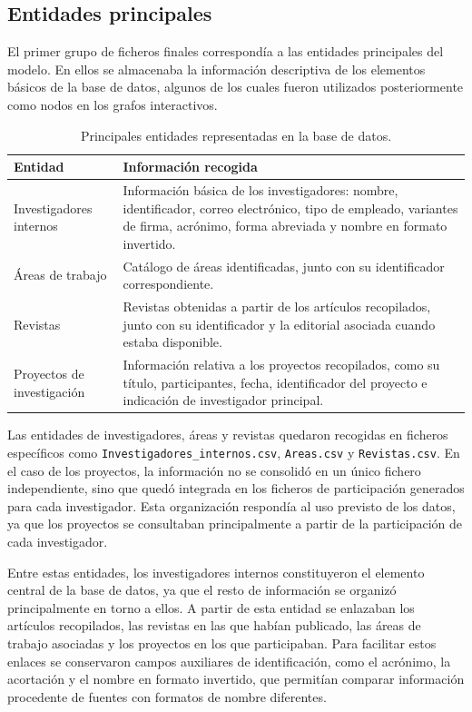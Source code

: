\documentclass[11pt,spanish,listoffigures,listoftables]{tfgetsinf}
\begin{document}
\subsection{Entidades principales}

El primer grupo de ficheros finales correspondía a las entidades principales del modelo. En ellos se almacenaba la información descriptiva de los elementos básicos de la base de datos, algunos de los cuales fueron utilizados posteriormente como nodos en los grafos interactivos.

\begin{table}[H]
\centering
\small
\renewcommand{\arraystretch}{1.25}
\begin{tabularx}{\textwidth}{
>{\raggedright\arraybackslash}p{3.5cm}
>{\raggedright\arraybackslash}X
}
\toprule
\textbf{Entidad} & \textbf{Información recogida} \\
\midrule
Investigadores internos 
& Información básica de los investigadores: nombre, identificador, correo electrónico, tipo de empleado, variantes de firma, acrónimo, forma abreviada y nombre en formato invertido. \\
\midrule
Áreas de trabajo 
& Catálogo de áreas identificadas, junto con su identificador correspondiente. \\
\midrule
Revistas 
& Revistas obtenidas a partir de los artículos recopilados, junto con su identificador y la editorial asociada cuando estaba disponible. \\
\midrule
Proyectos de investigación 
& Información relativa a los proyectos recopilados, como su título, participantes, fecha, identificador del proyecto e indicación de investigador principal. \\
\bottomrule
\end{tabularx}
\caption{Principales entidades representadas en la base de datos.}
\end{table}

Las entidades de investigadores, áreas y revistas quedaron recogidas en ficheros específicos como \texttt{Investigadores\_internos.csv}, \texttt{Areas.csv} y \texttt{Revistas.csv}. En el caso de los proyectos, la información no se consolidó en un único fichero independiente, sino que quedó integrada en los ficheros de participación generados para cada investigador. Esta organización respondía al uso previsto de los datos, ya que los proyectos se consultaban principalmente a partir de la participación de cada investigador.

Entre estas entidades, los investigadores internos constituyeron el elemento central de la base de datos, ya que el resto de información se organizó principalmente en torno a ellos. A partir de esta entidad se enlazaban los artículos recopilados, las revistas en las que habían publicado, las áreas de trabajo asociadas y los proyectos en los que participaban. Para facilitar estos enlaces se conservaron campos auxiliares de identificación, como el acrónimo, la acortación y el nombre en formato invertido, que permitían comparar información procedente de fuentes con formatos de nombre diferentes.
\end{document}
